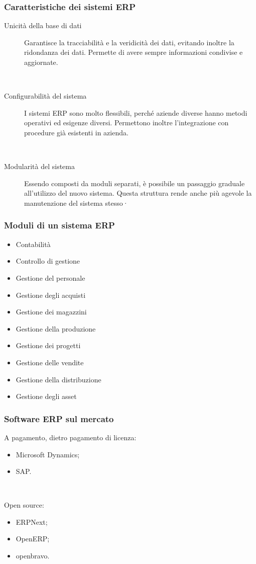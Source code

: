 \documentclass[]{beamer}
\begin{document}
\begin{frame}
\frametitle{Caratteristiche dei sistemi ERP}
\begin{description}
  \item[Unicità della base di dati] Garantisce la tracciabilità e la veridicità dei dati, evitando inoltre la ridondanza dei dati. Permette di avere sempre informazioni condivise e aggiornate.\pause
  
  ~

  \item[Configurabilità del sistema] I sistemi ERP sono molto flessibili, perché aziende diverse hanno metodi operativi ed esigenze diversi. Permettono inoltre l'integrazione con procedure già esistenti in azienda.\pause
  
  ~
  
  \item[Modularità del sistema] Essendo composti da moduli separati, è possibile un passaggio graduale all'utilizzo del nuovo sistema. Questa struttura rende anche più agevole la manutenzione del sistema stesso· 
\end{description}
\end{frame}


\begin{frame}
\frametitle{Moduli di un sistema ERP}
\begin{itemize}
  \item Contabilità
  \item Controllo di gestione
  \item Gestione del personale
  \item Gestione degli acquisti
  \item Gestione dei magazzini
  \item Gestione della produzione
  \item Gestione dei progetti
  \item Gestione delle vendite
  \item Gestione della distribuzione
  \item Gestione degli asset
\end{itemize}
\end{frame}



\begin{frame}
\frametitle{Software ERP sul mercato}
A pagamento, dietro pagamento di licenza:
\begin{itemize}
  \item Microsoft Dynamics;
  \item SAP.
\end{itemize}\pause

~

Open source:
\begin{itemize}
  \item ERPNext;
  \item OpenERP;
  \item openbravo.
\end{itemize}
\end{frame}
\end{document}
